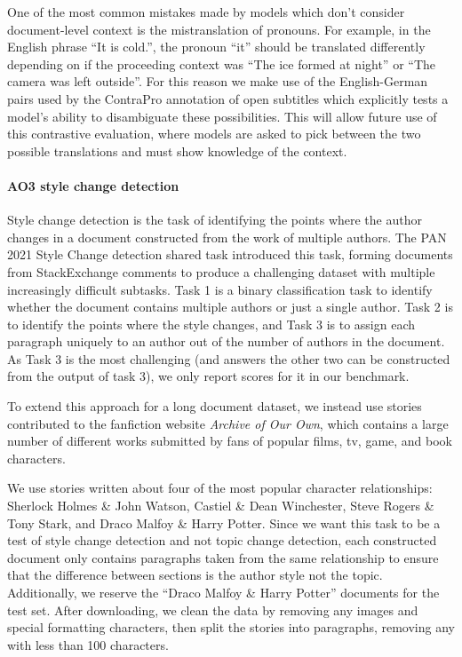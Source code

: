 \documentclass[10pt, a4paper]{article}
\begin{document}
One of the most common mistakes made by models which don't consider document-level context is the mistranslation of pronouns. For example, in the English phrase ``It is cold.'', the pronoun ``it'' should be translated differently depending on if the proceeding context was ``The ice formed at night'' or ``The camera was left outside''. For this reason we make use of the English-German pairs used by the ContraPro annotation of open subtitles \cite{muller2018large} which explicitly tests a model's ability to disambiguate these possibilities. This will allow future use of this contrastive evaluation, where models are asked to pick between the two possible translations and must show knowledge of the context.

\paragraph{AO3 style change detection}
Style change detection is the task of identifying the points where the author changes in a document constructed from the work of multiple authors. The PAN 2021 Style Change detection shared task \cite{Zangerle_2021Overview} introduced this task, forming documents from StackExchange comments to produce a challenging dataset with multiple increasingly difficult subtasks. Task 1 is a binary classification task to identify whether the document contains multiple authors or just a single author. Task 2 is to identify the points where the style changes, and Task 3 is to assign each paragraph uniquely to an author out of the number of authors in the document. As Task 3 is the most challenging (and answers the other two can be constructed from the output of task 3), we only report scores for it in our benchmark.

To extend this approach for a long document dataset, we instead use stories contributed to the fanfiction website \textit{Archive of Our Own}, which contains a large number of different works submitted by fans of popular films, tv, game, and book characters. 

We use stories written about four of the most popular character relationships: Sherlock Holmes \& John Watson, Castiel \& Dean Winchester, Steve Rogers \& Tony Stark, and Draco Malfoy \& Harry Potter. Since we want this task to be a test of style change detection and not topic change detection, each constructed document only contains paragraphs taken from the same relationship to ensure that the difference between sections is the author style not the topic. Additionally, we reserve the ``Draco Malfoy \& Harry Potter'' documents for the test set.
After downloading, we clean the data by removing any images and special formatting characters, then split the stories into paragraphs, removing any with less than 100 characters.
\end{document}

